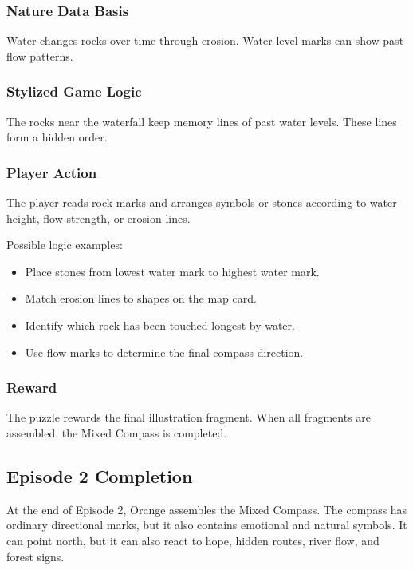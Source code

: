 \documentclass[12pt]{article}
\begin{document}
\subsubsection{Nature Data Basis}

Water changes rocks over time through erosion. Water level marks can show past flow patterns.

\subsubsection{Stylized Game Logic}

The rocks near the waterfall keep memory lines of past water levels. These lines form a hidden order.

\subsubsection{Player Action}

The player reads rock marks and arranges symbols or stones according to water height, flow strength, or erosion lines.

Possible logic examples:

\begin{itemize}[leftmargin=*]
    \item Place stones from lowest water mark to highest water mark.
    \item Match erosion lines to shapes on the map card.
    \item Identify which rock has been touched longest by water.
    \item Use flow marks to determine the final compass direction.
\end{itemize}

\subsubsection{Reward}

The puzzle rewards the final illustration fragment. When all fragments are assembled, the Mixed Compass is completed.

\subsection{Episode 2 Completion}

At the end of Episode 2, Orange assembles the Mixed Compass. The compass has ordinary directional marks, but it also contains emotional and natural symbols. It can point north, but it can also react to hope, hidden routes, river flow, and forest signs.
\end{document}
